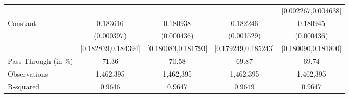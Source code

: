 {\begin{tabular}{l*{4}{c}}
                    &                     &                     &                     &[0.002267,0.004638]         \\
Constant            &    0.183616\sym{***}&    0.180938\sym{***}&    0.182246\sym{***}&    0.180945\sym{***}\\
                    &  (0.000397)         &  (0.000436)         &  (0.001529)         &  (0.000436)         \\
                    &[0.182839,0.184394]         &[0.180083,0.181793]         &[0.179249,0.185243]         &[0.180090,0.181800]         \\
\midrule
Pass-Through (in \%)&       71.36         &       70.58         &       69.87         &       69.74         \\
Observations        &   1,462,395         &   1,462,395         &   1,462,395         &   1,462,395         \\
R-squared           &      0.9646         &      0.9647         &      0.9649         &      0.9647         \\
\bottomrule
\end{tabular}
}
